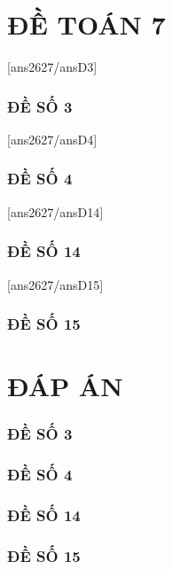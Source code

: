 



\part{ĐỀ TOÁN 7}

[ans2627/ansD3]
\setcounter{bt}{0}
\section{ĐỀ SỐ 3}


[ans2627/ansD4]
\setcounter{bt}{0}
\section{ĐỀ SỐ 4}


[ans2627/ansD14]
\setcounter{bt}{0}
\section{ĐỀ SỐ 14}


[ans2627/ansD15]
\setcounter{bt}{0}
\section{ĐỀ SỐ 15}


\part{ĐÁP ÁN}
\setcounter{section}{0}

\section{ĐỀ SỐ 3}


\section{ĐỀ SỐ 4}


\section{ĐỀ SỐ 14}


\section{ĐỀ SỐ 15}



